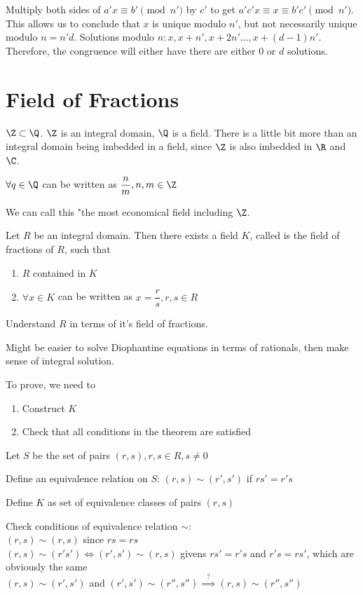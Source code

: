 \documentclass[10pt]{article}
\begin{document}
Multiply both sides of $a'x \equiv b' \pmod{n'}$ by $c'$ to get $a'c'x \equiv x \equiv b'c' \pmod{n'}$. This allows us to conclude that $x$ is unique modulo $n'$, but not necessarily unique modulo $n = n'd$. Solutions modulo $n: x, x + n', x + 2n' \ldots, x + (d-1)n'$. Therefore, the congruence will either have there are either 0 or $d$ solutions.

\section{Field of Fractions}
$\Z \subset \Q$. $\Z$ is an integral domain, $\Q$ is a field. There is a little bit more than an integral domain being imbedded in a field, since $\Z$ is also imbedded in $\R$ and $\C$. 

\begin{rmk}
    $\forall q\in \Q$ can be written as $\dfrac{n}{m}, n, m \in \Z$
\end{rmk}
We can call this "the most economical field including $\Z$.

\begin{thm}
    Let $R$ be an integral domain. Then there exists a field $K$, called is the field of fractions of $R$, such that 
    \begin{enumerate}
        \item $R$ contained in $K$
        \item $\forall x\in K$ can be written as $x = \dfrac{r}{s}, r , s\in R$
    \end{enumerate}
\end{thm}
Understand $R$ in terms of it's field of fractions. 

Might be easier to solve Diophantine equations in terms of rationals, then make sense of integral solution.

To prove, we need to 
\begin{enumerate}
    \item Construct $K$ 
    \item Check that all conditions in the theorem are satisfied
\end{enumerate}

Let $S$ be the set of pairs $(r, s), r, s \in R, s\neq 0$

Define an equivalence relation on $S$: $(r, s) \sim (r', s')$ if $rs' = r's$

Define $K$ as set of equivalence classes of pairs $(r, s)$

Check conditions of equivalence relation $\sim$: \\
$(r, s) \sim (r, s)$ since $rs = rs$\\
$(r, s) \sim (r' s') \iff (r', s') \sim (r, s)$ givens $rs' = r's$ and $r's = rs'$, which are obviously the same\\
$(r, s) \sim (r', s')$ and $(r', s') \sim (r'', s'') \stackrel{?}{\implies} (r, s) \sim (r'', s'')$
\end{document}
